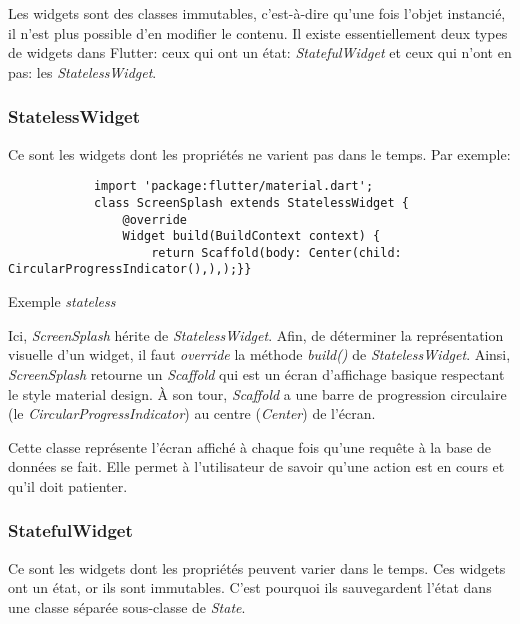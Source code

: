Les widgets sont des classes immutables, c'est-à-dire qu'une fois l'objet instancié, il n'est plus possible d'en modifier le contenu.
Il existe essentiellement deux types de widgets dans Flutter: ceux qui ont un état: \textit{StatefulWidget} et ceux qui n'ont en pas:
les \textit{StatelessWidget}.

\subsubsection*{StatelessWidget}
Ce sont les widgets dont les propriétés ne varient pas dans le temps. Par exemple:

\begin{listing}[h]
    \begin{verbatim}
            import 'package:flutter/material.dart';
            class ScreenSplash extends StatelessWidget {
                @override
                Widget build(BuildContext context) {
                    return Scaffold(body: Center(child: CircularProgressIndicator(),),);}}
        \end{verbatim}
    \caption{Exemple \textit{stateless}}
    \label{code:statelessExample}
\end{listing}

Ici, \textit{ScreenSplash} hérite de \textit{StatelessWidget}. Afin, de déterminer la représentation visuelle d'un widget,
il faut \textit{override} la méthode \textit{build()} de \textit{StatelessWidget}. Ainsi, \textit{ScreenSplash} retourne un \textit{Scaffold}
qui est un écran d'affichage basique respectant le style material design. À son tour,
\textit{Scaffold} a une barre de progression circulaire (le \textit{CircularProgressIndicator}) au centre (\textit{Center}) de l'écran.

Cette classe représente l'écran affiché à chaque fois qu'une requête à la base de données se fait. Elle permet à l'utilisateur de savoir qu'une action
est en cours et qu'il doit patienter.
\newpage
\subsubsection*{StatefulWidget}
Ce sont les widgets dont les propriétés peuvent varier dans le temps. Ces widgets ont un état, or ils sont immutables. C'est pourquoi ils sauvegardent
l'état dans une classe séparée  sous-classe de \textit{State}.

